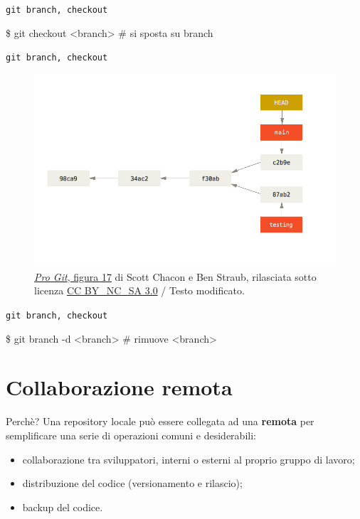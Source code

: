 \documentclass{beamer}
\begin{document}
\begin{frame}{\texttt{git branch, checkout}}
  \begin{semiverbatim}
    \$ git checkout <branch> \# si sposta su branch
  \end{semiverbatim}
\end{frame}

\begin{frame}{\texttt{git branch, checkout}}
  \begin{semiverbatim}
  \begin{figure}
    \includegraphics[width=\textwidth]{assets/advance-main.png}
    \caption{
      \href{https://git-scm.com/book/en/v2/Git-Branching-Branches-in-a-Nutshell}{\emph{Pro Git},
      figura 17} di Scott Chacon e Ben Straub, rilasciata sotto licenza
      \href{https://creativecommons.org/licenses/by-nc-sa/3.0/}{CC
      BY\_NC\_SA 3.0} / Testo modificato.
    }
  \end{figure}
  \end{semiverbatim}
\end{frame}

\begin{frame}{\texttt{git branch, checkout}}
  \begin{semiverbatim}
    \$ git branch -d <branch> \# rimuove <branch>
  \end{semiverbatim}
\end{frame}

\section{Collaborazione remota}
\begin{frame}{Perch\`e?}
  Una repository locale pu\`o essere collegata ad una \textbf{remota} per
  semplificare una serie di operazioni comuni e desiderabili:
  \begin{itemize}
    \item<1-> collaborazione tra sviluppatori, interni o esterni al proprio gruppo di lavoro;
    \item<2-> distribuzione del codice (versionamento e rilascio);
    \item<3-> backup del codice.
  \end{itemize}
\end{frame}
\end{document}
